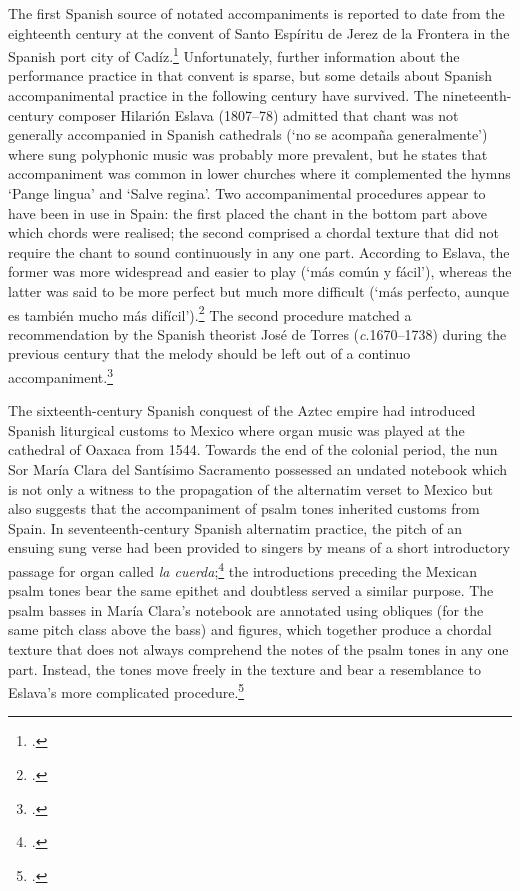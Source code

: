The first Spanish source of notated accompaniments is reported to date from the eighteenth century at the convent of Santo Espíritu de Jerez de la Frontera in the Spanish port city of Cadíz.\footcite[39]{JambouDoscategoriascanto2007}
Unfortunately, further information about the performance practice in that convent is sparse, but some details about Spanish accompanimental practice in the following century have survived.
%
The nineteenth-century composer Hilarión Eslava (1807--78) admitted that chant was not generally accompanied in Spanish cathedrals (`no se acompaña generalmente') where sung polyphonic music was probably more prevalent, but he states that accompaniment was common in lower churches where it complemented the hymns `Pange lingua' and `Salve regina'.
Two accompanimental procedures appear to have been in use in Spain: the first placed the chant in the bottom part above which chords were realised; the second comprised a chordal texture that did not require the chant to sound continuously in any one part.
According to Eslava, the former was more widespread and easier to play (`más común y fácil'), whereas the latter was said to be more perfect but much more difficult (`más perfecto, aunque es también mucho más difícil').\footcite[46--9]{EslavaMuseoorganicoespanol1853}
The second procedure matched a recommendation by the Spanish theorist José de Torres (\emph{c}.1670--1738) during the previous century that the melody should be left out of a continuo accompaniment.\footcites[95--6]{TorresReglasgeneralesacompanar1736}[990--92]{Torresfacetadesatendidaquehacer2013}
\noclub[2]

The sixteenth-century Spanish conquest of the Aztec empire had introduced Spanish liturgical customs to Mexico where organ music was played at the cathedral of Oaxaca from 1544.
Towards the end of the colonial period, the nun Sor María Clara del Santísimo Sacramento possessed an undated notebook which is not only a witness to the propagation of the alternatim verset to Mexico but also suggests that the accompaniment of psalm tones inherited customs from Spain.
In seventeenth-century Spanish alternatim practice, the pitch of an ensuing sung verse had been provided to singers by means of a short introductory passage for organ called \emph{la cuerda};\footcite[239]{NelsonAlternatimPractice17thCentury1994} the introductions preceding the Mexican psalm tones bear the same epithet and doubtless served a similar purpose.
The psalm basses in María Clara's notebook are annotated using obliques (for the same pitch class above the bass) and figures, which together produce a chordal texture that does not always comprehend the notes of the psalm tones in any one part. Instead, the tones move freely in the texture and bear a resemblance to Eslava's more complicated procedure.\footcite[pp.~xiii, xxi]{JohnsonCuadernoTonosMaitines2005}
\noclub[2]

